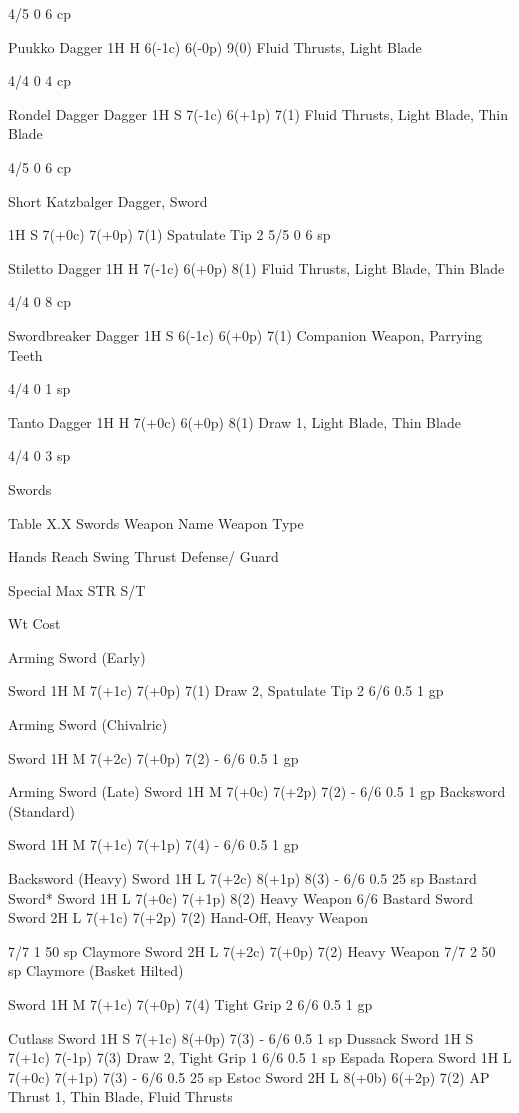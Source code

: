 \documentclass[oneside,11pt,english]{book}
\begin{document}
4/5 0 6 cp 

Puukko Dagger 1H H 6(-1c) 6(-0p) 9(0) Fluid Thrusts, Light 
Blade 

4/4 0 4 cp 

Rondel Dagger Dagger 1H S 7(-1c) 6(+1p) 7(1) Fluid Thrusts, Light 
Blade, Thin Blade 

4/5 0 6 cp 


Short Katzbalger Dagger, 
Sword 

1H S 7(+0c) 7(+0p) 7(1) Spatulate Tip 2 5/5 0 6 sp 

Stiletto Dagger 1H H 7(-1c) 6(+0p) 8(1) Fluid Thrusts, Light 
Blade, Thin Blade 

4/4 0 8 cp 

Swordbreaker Dagger 1H S 6(-1c) 6(+0p) 7(1) Companion Weapon, 
Parrying Teeth 

4/4 0 1 sp 

Tanto Dagger 1H H 7(+0c) 6(+0p) 8(1) Draw 1, Light Blade, 
Thin Blade 

4/4 0 3 sp 

 

Swords 

 
Table X.X Swords 
Weapon Name Weapon 
Type 

Hands Reach Swing Thrust Defense/ 
Guard 

Special Max 
STR S/T 

Wt Cost 

Arming Sword 
(Early) 

Sword 1H M 7(+1c) 7(+0p) 7(1) Draw 2, Spatulate Tip 2 6/6 0.5 1 gp 

Arming Sword 
(Chivalric) 

Sword 1H M 7(+2c) 7(+0p) 7(2) - 6/6 0.5 1 gp 

Arming Sword (Late) Sword 1H M 7(+0c) 7(+2p) 7(2) - 6/6 0.5 1 gp 
Backsword 
(Standard) 

Sword 1H M 7(+1c) 7(+1p) 7(4) - 6/6 0.5 1 gp 

Backsword (Heavy) Sword 1H L 7(+2c) 8(+1p) 8(3) - 6/6 0.5 25 
sp 
Bastard Sword* Sword 1H L 7(+0c) 7(+1p) 8(2) Heavy Weapon 6/6 
Bastard Sword Sword 2H L 7(+1c) 7(+2p) 7(2) Hand-Off, Heavy 
Weapon 

7/7 1 50 
sp 
Claymore Sword 2H L 7(+2c) 7(+0p) 7(2) Heavy Weapon 7/7 2 50 
sp 
Claymore (Basket 
Hilted) 

Sword 1H M 7(+1c) 7(+0p) 7(4) Tight Grip 2 6/6 0.5 1 gp 

Cutlass Sword 1H S 7(+1c) 8(+0p) 7(3) - 6/6 0.5 1 sp 
Dussack Sword 1H S 7(+1c) 7(-1p) 7(3) Draw 2, Tight Grip 1 6/6 0.5 1 sp 
Espada Ropera Sword 1H L 7(+0c) 7(+1p) 7(3) - 6/6 0.5 25 
sp 
Estoc Sword 2H L 8(+0b) 6(+2p) 7(2) AP Thrust 1, Thin 
Blade, Fluid Thrusts 
\end{document}
